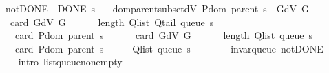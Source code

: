 \begin{isabellebody}
\ \ \ not{\isacharunderscore}{\kern0pt}DONE{\isacharcolon}{\kern0pt}\ {\isachardoublequoteopen}{\isasymnot}\ DONE\ s{\isachardoublequoteclose}\isanewline
\ \ \ dom{\isacharunderscore}{\kern0pt}parent{\isacharunderscore}{\kern0pt}subset{\isacharunderscore}{\kern0pt}dV{\isacharcolon}{\kern0pt}\ {\isachardoublequoteopen}P{\isachardot}{\kern0pt}dom\ {\isacharparenleft}{\kern0pt}parent\ s{\isacharparenright}{\kern0pt}\ {\isasymsubseteq}\ G{\isachardot}{\kern0pt}dV\ G{\isachardoublequoteclose}\isanewline
\ \ \isanewline
\ \ \ \ {\isachardoublequoteopen}card\ {\isacharparenleft}{\kern0pt}G{\isachardot}{\kern0pt}dV\ G{\isacharparenright}{\kern0pt}\ {\isacharplus}{\kern0pt}\isanewline
\ \ \ \ \ length\ {\isacharparenleft}{\kern0pt}Q{\isacharunderscore}{\kern0pt}list\ {\isacharparenleft}{\kern0pt}Q{\isacharunderscore}{\kern0pt}tail\ {\isacharparenleft}{\kern0pt}queue\ s{\isacharparenright}{\kern0pt}{\isacharparenright}{\kern0pt}{\isacharparenright}{\kern0pt}\ {\isacharminus}{\kern0pt}\isanewline
\ \ \ \ \ card\ {\isacharparenleft}{\kern0pt}P{\isachardot}{\kern0pt}dom\ {\isacharparenleft}{\kern0pt}parent\ s{\isacharparenright}{\kern0pt}{\isacharparenright}{\kern0pt}\ {\isacharless}{\kern0pt}\isanewline
\ \ \ \ \ card\ {\isacharparenleft}{\kern0pt}G{\isachardot}{\kern0pt}dV\ G{\isacharparenright}{\kern0pt}\ {\isacharplus}{\kern0pt}\isanewline
\ \ \ \ \ length\ {\isacharparenleft}{\kern0pt}Q{\isacharunderscore}{\kern0pt}list\ {\isacharparenleft}{\kern0pt}queue\ s{\isacharparenright}{\kern0pt}{\isacharparenright}{\kern0pt}\ {\isacharminus}{\kern0pt}\isanewline
\ \ \ \ \ card\ {\isacharparenleft}{\kern0pt}P{\isachardot}{\kern0pt}dom\ {\isacharparenleft}{\kern0pt}parent\ s{\isacharparenright}{\kern0pt}{\isacharparenright}{\kern0pt}{\isachardoublequoteclose}\isanewline
%
\isadelimproof
%
\endisadelimproof
%
\isatagproof
{}\isamarkupfalse%
\ {\isacharminus}{\kern0pt}\isanewline
\ \ \isamarkupfalse%
\ {\isachardoublequoteopen}Q{\isacharunderscore}{\kern0pt}list\ {\isacharparenleft}{\kern0pt}queue\ s{\isacharparenright}{\kern0pt}\ {\isasymnoteq}\ {\isacharbrackleft}{\kern0pt}{\isacharbrackright}{\kern0pt}{\isachardoublequoteclose}\isanewline
\ \ \ \ \isamarkupfalse%
\ invar{\isacharunderscore}{\kern0pt}queue\ not{\isacharunderscore}{\kern0pt}DONE\isanewline
\ \ \ \ \isamarkupfalse%
\ {\isacharparenleft}{\kern0pt}intro\ list{\isacharunderscore}{\kern0pt}queue{\isacharunderscore}{\kern0pt}non{\isacharunderscore}{\kern0pt}empty{\isacharparenright}{\kern0pt}\isanewline

\end{isabellebody}
